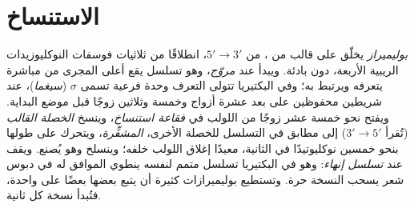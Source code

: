\section{الاستنساخ}

\begin{definition}\label{def:b1:gene-expression:transcription}
\emph{بوليميراز } يخلّق  على قالب من ، من $5' \to 3'$،
انطلاقًا من ثلاثيات فوسفات النوكليوزيدات الريبية الأربعة، دون
بادئة. ويبدأ عند \emph{مروّج}، وهو تسلسل يقع أعلى المجرى من
 مباشرة يتعرفه ويرتبط به؛ وفي البكتيريا تتولى التعرف وحدة
فرعية تسمى $\sigma$ (\emph{سيغما})، عند شريطين محفوظين على بعد
عشرة أزواج وخمسة وثلاثين زوجًا قبل موضع البداية. ويفتح  نحو
خمسة عشر زوجًا من اللولب في \emph{فقاعة استنساخ}، وينسخ
\emph{الخصلة القالب} (تُقرأ $3' \to 5'$) إلى  مطابق في التسلسل
للخصلة الأخرى، \emph{المشفِّرة}، ويتحرك على طولها بنحو خمسين
نوكليوتيدًا في الثانية، معيدًا إغلاق اللولب خلفه؛ وينسلخ  وهو
يُصنع. ويقف عند \emph{تسلسل إنهاء}: وهو في البكتيريا تسلسل متمم
لنفسه ينطوي  الموافق له في دبوس شعر يسحب النسخة حرة. وتستطيع
بوليميرازات كثيرة أن يتبع بعضها بعضًا على  واحدة، فتُبدأ نسخة
كل ثانية.
\end{definition}


